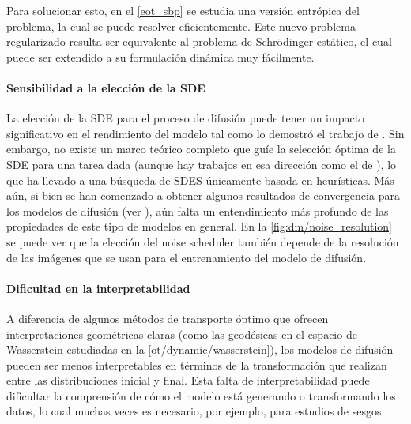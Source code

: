
Para solucionar esto, en el \autoref{eot_sbp} se estudia una versión entrópica del problema, la cual se puede resolver eficientemente. Este nuevo problema regularizado resulta ser equivalente al problema de Schrödinger estático, el cual puede ser extendido a su formulación dinámica muy fácilmente.

\paragraph{Sensibilidad a la elección de la SDE}

La elección de la SDE para el proceso de difusión puede tener un impacto significativo en el rendimiento del modelo tal como lo demostró el trabajo de \cite{song2021scorebased}. Sin embargo, no existe un marco teórico completo que guíe la selección óptima de la SDE para una tarea dada (aunque hay trabajos en esa dirección como el de \cite{karras2022elucidatingdesignspacediffusionbased}), lo que ha llevado a una búsqueda de SDES únicamente basada en heurísticas. Más aún, si bien se han comenzado a obtener algunos resultados de convergencia para los modelos de difusión (ver \cite{debortoli2023convergencedenoisingdiffusionmodels}), aún falta un entendimiento más profundo de las propiedades de este tipo de modelos en general. En la \autoref{fig:dm/noise_resolution} se puede ver que la elección del noise scheduler también depende de la resolución de las imágenes que se usan para el entrenamiento del modelo de difusión.


\paragraph{Dificultad en la interpretabilidad}

A diferencia de algunos métodos de transporte óptimo que ofrecen interpretaciones geométricas claras (como las geodésicas en el espacio de Wasserstein estudiadas en la \autoref{ot/dynamic/wasserstein}), los modelos de difusión pueden ser menos interpretables en términos de la transformación que realizan entre las distribuciones inicial y final. Esta falta de interpretabilidad puede dificultar la comprensión de cómo el modelo está generando o transformando los datos, lo cual muchas veces es necesario, por ejemplo, para estudios de sesgos.

